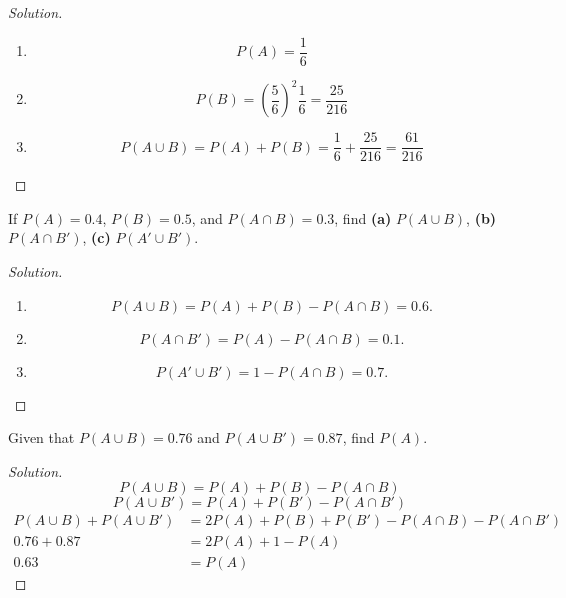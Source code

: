 \documentclass[class=probandstats,crop=false]{standalone}
\begin{document}
\begin{proof}[Solution]
    \begin{enumerate}[label = \textbf{(\alph*)}]
        \item
              \[ P(A) = \dfrac{1}{6} \]
        \item
              \[
                  P(B) = \left(\dfrac{5}{6}\right)^{2}\dfrac{1}{6} = \dfrac{25}{216}
              \]
        \item
              \[
                  P(A\cup B) = P(A) + P(B) = \dfrac{1}{6} + \dfrac{25}{216} = \dfrac{61}{216}
              \]
    \end{enumerate}
\end{proof}

\begin{exercise}
    \par If $P(A) = 0.4$, $P(B) = 0.5$, and $P(A\cap B) = 0.3$, find \textbf{(a)} $P(A\cup B)$, \textbf{(b)} $P(A\cap B')$, \textbf{(c)} $P(A'\cup B')$.
\end{exercise}

\begin{proof}[Solution]
    \begin{enumerate}[label = \textbf{(\alph*)}]
        \item
              \[ P(A\cup B) = P(A) + P(B) - P(A\cap B) = 0.6. \]
        \item
              \[ P(A\cap B') = P(A) - P(A\cap B) = 0.1. \]
        \item
              \[ P(A'\cup B') = 1 - P(A\cap B) = 0.7. \]
    \end{enumerate}
\end{proof}

\begin{exercise}
    \par Given that $P(A\cup B) = 0.76$ and $P(A\cup B') = 0.87$, find $P(A)$.
\end{exercise}

\begin{proof}[Solution]
    \[ P(A\cup B) = P(A) + P(B) - P(A\cap B) \]
    \[ P(A\cup B') = P(A) + P(B') - P(A\cap B') \]
    \begin{align*}
        P(A\cup B) + P(A\cup B') & = 2P(A) + P(B) + P(B') - P(A\cap B) - P(A\cap B') \\
        0.76 + 0.87              & = 2P(A) + 1 - P(A)                                \\
        0.63                     & = P(A)
    \end{align*}
\end{proof}
\end{document}
